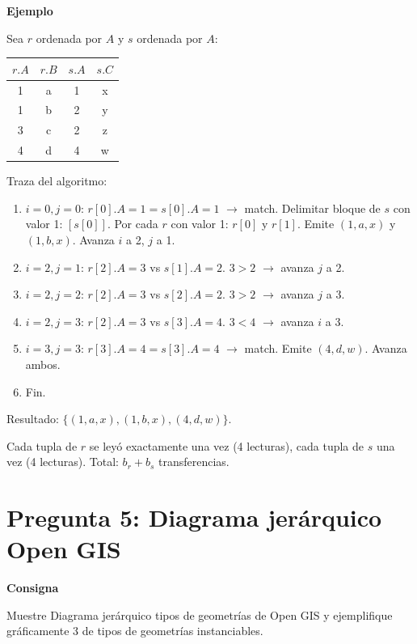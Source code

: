 \documentclass[11pt,a4paper]{article}
\newcommand{\itemcabecera}[1]{\noindent\textbf{#1}\par\medskip}
\newcommand{\bloqueConsigna}{\itemcabecera{Consigna}}
\newcommand{\bloqueEjemplo}{\itemcabecera{Ejemplo}}
\begin{document}
\bloqueEjemplo

Sea $r$ ordenada por $A$ y $s$ ordenada por $A$:

\begin{center}
\begin{tabular}{cc|cc}
\toprule
$r.A$ & $r.B$ & $s.A$ & $s.C$ \\
\midrule
1 & a & 1 & x \\
1 & b & 2 & y \\
3 & c & 2 & z \\
4 & d & 4 & w \\
\bottomrule
\end{tabular}
\end{center}

Traza del algoritmo:

\begin{enumerate}
    \item $i{=}0, j{=}0$: $r[0].A{=}1 = s[0].A{=}1$ $\to$ match. Delimitar bloque de $s$ con valor 1: $[s[0]]$. Por cada $r$ con valor 1: $r[0]$ y $r[1]$. Emite $(1,a,x)$ y $(1,b,x)$. Avanza $i$ a 2, $j$ a 1.
    \item $i{=}2, j{=}1$: $r[2].A{=}3$ vs $s[1].A{=}2$. $3 > 2$ $\to$ avanza $j$ a 2.
    \item $i{=}2, j{=}2$: $r[2].A{=}3$ vs $s[2].A{=}2$. $3 > 2$ $\to$ avanza $j$ a 3.
    \item $i{=}2, j{=}3$: $r[2].A{=}3$ vs $s[3].A{=}4$. $3 < 4$ $\to$ avanza $i$ a 3.
    \item $i{=}3, j{=}3$: $r[3].A{=}4 = s[3].A{=}4$ $\to$ match. Emite $(4,d,w)$. Avanza ambos.
    \item Fin.
\end{enumerate}

Resultado: $\{(1,a,x), (1,b,x), (4,d,w)\}$.

Cada tupla de $r$ se leyó exactamente una vez (4 lecturas), cada tupla de $s$ una vez (4 lecturas). Total: $b_r + b_s$ transferencias.

\section{Pregunta 5: Diagrama jerárquico Open GIS}

\bloqueConsigna

Muestre Diagrama jerárquico tipos de geometrías de Open GIS y ejemplifique gráficamente 3 de tipos de geometrías instanciables.
\end{document}
